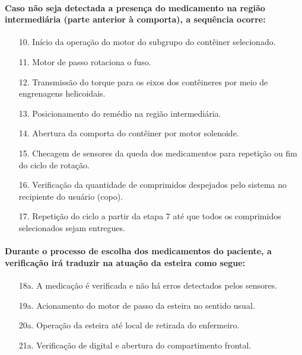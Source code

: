 \paragraph*{Caso não seja detectada a presença do medicamento na região intermediária (parte  anterior à comporta), a sequência ocorre:}

\begin{enumerate}
    \item[10.] Início da operação do motor do subgrupo do contêiner selecionado.
    \item[11.] Motor de passo rotaciona o fuso.
    \item[12.] Transmissão do torque para os eixos dos contêineres por meio de engrenagens helicoidais.
    \item[13.] Posicionamento do remédio na região intermediária.
    \item[14.] Abertura da comporta do contêiner por motor solenoide.
    \item[15.] Checagem de sensores da queda dos medicamentos para repetição ou fim do ciclo de rotação.
    \item[16.] Verificação da quantidade de comprimidos despejados pelo sistema no recipiente do usuário (copo).
    \item[17.] Repetição do ciclo a partir da etapa 7 até que todos os comprimidos selecionados sejam entregues.
\end{enumerate}


\paragraph*{Durante o processo de escolha dos medicamentos do paciente, a verificação irá traduzir na atuação da esteira como segue:}

\begin{enumerate}
    \item[18a.] A medicação é verificada e não há erros detectados pelos sensores.
    \item[19a.] Acionamento do motor de passo da esteira no sentido usual.
    \item[20a.] Operação da esteira até local de retirada do enfermeiro. 
    \item[21a.] Verificação de digital e abertura do compartimento frontal.
\end{enumerate}
   
